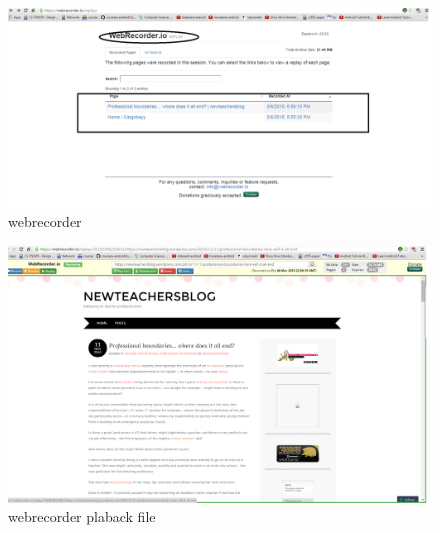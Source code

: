 \documentclass[12pt]{Report}
\begin{document}
\newpage
\begin{figure}[ht]    
    \begin{center}
        \includegraphics[scale=0.60]{webrecorderio-replay.png}
        \caption{webrecorder}
        \label{webrecorder.io}
    \end{center}
\end{figure}
\newpage
\begin{figure}[ht]    
    \begin{center}
        \includegraphics[scale=0.60]{webrecorderio-playbackfile1.png}
        \caption{webrecorder plaback file}
        \label{webrecorder playback}
    \end{center}
\end{figure}
\newpage
\end{document}
